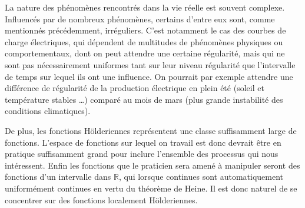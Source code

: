 
La nature des phénomènes rencontrés dans la vie réelle est souvent complexe. Influencés par de nombreux phénomènes, certains d'entre eux sont, comme mentionnés précédemment, irréguliers. C'est notamment le cas des courbes de charge électriques, qui dépendent de multitudes de phénomènes physiques ou comportementaux, dont on peut attendre une certaine régularité, mais qui ne sont pas nécessairement uniformes tant sur leur niveau régularité que l'intervalle de temps sur lequel ils ont une influence. On pourrait par exemple attendre une différence de régularité de la production électrique en plein été (soleil et température stables \ldots) comparé au mois de mars (plus grande instabilité des conditions climatiques).

De plus, les fonctions Hölderiennes représentent une classe suffisamment large de fonctions. L'espace de fonctions sur lequel on travail est donc devrait être en pratique suffisamment grand pour inclure l'ensemble des processus qui nous intéressent. Enfin les fonctions que le praticien sera amené à manipuler seront des fonctions d'un intervalle dans $\mathds R$, qui lorsque continues sont automatiquement uniformément continues en vertu du théorème de Heine. Il est donc naturel de se concentrer sur des fonctions localement Hölderiennes.